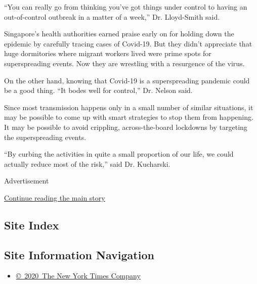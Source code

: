 ``You can really go from thinking you've got things under control to
having an out-of-control outbreak in a matter of a week,'' Dr.
Lloyd-Smith said.

Singapore's health authorities earned praise early on for holding down
the epidemic by carefully tracing cases of Covid-19. But they didn't
appreciate that huge dormitories where migrant workers lived were prime
spots for superspreading events. Now they are wrestling with a
resurgence of the virus.

On the other hand, knowing that Covid-19 is a superspreading pandemic
could be a good thing. ``It bodes well for control,'' Dr. Nelson said.

Since most transmission happens only in a small number of similar
situations, it may be possible to come up with smart strategies to stop
them from happening. It may be possible to avoid crippling,
across-the-board lockdowns by targeting the superspreading events.

``By curbing the activities in quite a small proportion of our life, we
could actually reduce most of the risk,'' said Dr. Kucharski.

Advertisement

\protect\hyperlink{after-bottom}{Continue reading the main story}

\hypertarget{site-index}{%
\subsection{Site Index}\label{site-index}}

\hypertarget{site-information-navigation}{%
\subsection{Site Information
Navigation}\label{site-information-navigation}}

\begin{itemize}
\tightlist
\item
  \href{https://help.nytimes.com/hc/en-us/articles/115014792127-Copyright-notice}{©~2020~The
  New York Times Company}
\end{itemize}

